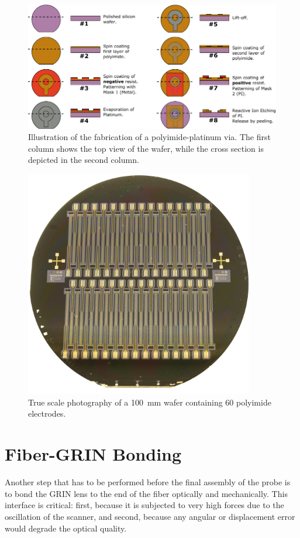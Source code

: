 \begin{figure}[h!]\centering \includegraphics[width=15cm]{figures/40_Fabrication/PI/processH.pdf}
      \caption{Illustration of the fabrication of a polyimide-platinum via. The first column shows the top view of the wafer, while the cross section is depicted in the second column.}
      \label{fig:piProcess}
\end{figure}

\begin{figure}[h!]\centering \includegraphics[width=10cm]{figures/40_Fabrication/PI/wafer.JPG}
      \caption{True scale photography of a \SI{100}{\milli\meter} wafer containing 60 polyimide electrodes.}
      \label{fig:piwafer}
\end{figure}

\clearpage
\section{Fiber-GRIN Bonding}
\label{sec:fiberGRIN}
Another step that has to be performed before the final assembly of the probe is to bond the GRIN lens to the end of the fiber optically and mechanically. This interface is critical: first, because it is subjected to very high forces due to the oscillation of the scanner, and second, because any angular or displacement error would degrade the optical quality.

